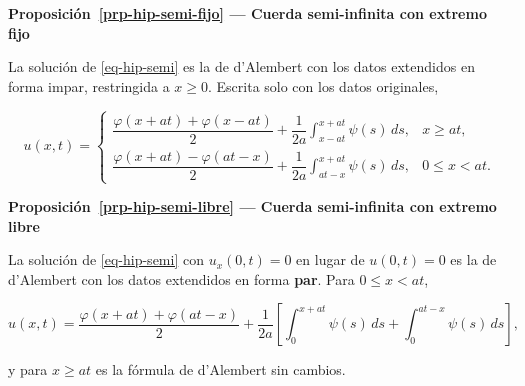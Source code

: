 \documentclass[
  spanish,
  a4paper,
]{scrbook}
\theoremstyle{definition}
\theoremstyle{plain}
\theoremstyle{definition}
\theoremstyle{plain}
\theoremstyle{definition}
\theoremstyle{remark}
\begin{document}
\begin{tcolorbox}[enhanced jigsaw, arc=.35mm, bottomrule=.15mm, breakable, colback=white, colframe=quarto-callout-note-color-frame, left=2mm, leftrule=.75mm, opacityback=0, rightrule=.15mm, toprule=.15mm]
\begin{minipage}[t]{5.5mm}
\textcolor{quarto-callout-note-color}{\faInfo}
\end{minipage}%
\begin{minipage}[t]{\textwidth - 5.5mm}

\vspace{-3mm}\textbf{Proposición~\ref{prp-hip-semi-fijo} --- Cuerda semi-infinita con extremo
fijo}\vspace{3mm}

La solución de \ref{eq-hip-semi} es la de d'Alembert con los datos
extendidos en forma impar, restringida a \(x\ge0\). Escrita solo con los
datos originales,

\[
u(x,t) =
\begin{cases}
\dfrac{\varphi(x+at)+\varphi(x-at)}{2} + \dfrac{1}{2a}\displaystyle\int_{x-at}^{x+at}\psi(s)\,ds, & x\ge at,\\[3mm]
\dfrac{\varphi(x+at)-\varphi(at-x)}{2} + \dfrac{1}{2a}\displaystyle\int_{at-x}^{x+at}\psi(s)\,ds, & 0\le x< at.
\end{cases}
\]

\end{minipage}%
\end{tcolorbox}

\begin{tcolorbox}[enhanced jigsaw, arc=.35mm, bottomrule=.15mm, breakable, colback=white, colframe=quarto-callout-note-color-frame, left=2mm, leftrule=.75mm, opacityback=0, rightrule=.15mm, toprule=.15mm]
\begin{minipage}[t]{5.5mm}
\textcolor{quarto-callout-note-color}{\faInfo}
\end{minipage}%
\begin{minipage}[t]{\textwidth - 5.5mm}

\vspace{-3mm}\textbf{Proposición~\ref{prp-hip-semi-libre} --- Cuerda semi-infinita con
extremo libre}\vspace{3mm}

La solución de \ref{eq-hip-semi} con \(u_x(0,t)=0\) en lugar de
\(u(0,t)=0\) es la de d'Alembert con los datos extendidos en forma
\textbf{par}. Para \(0\le x<at\),

\[
u(x,t) = \frac{\varphi(x+at)+\varphi(at-x)}{2} + \frac{1}{2a}\left[\int_{0}^{x+at}\psi(s)\,ds + \int_{0}^{at-x}\psi(s)\,ds\right],
\]

y para \(x\ge at\) es la fórmula de d'Alembert sin cambios.

\end{minipage}%
\end{tcolorbox}
\end{document}
